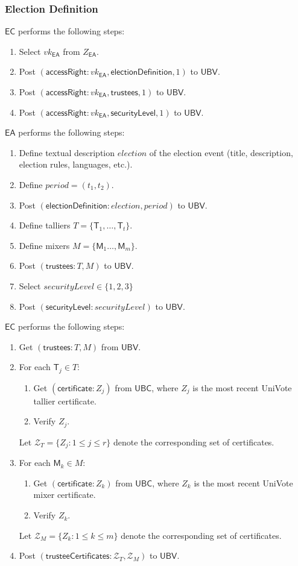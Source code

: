 \documentclass[bibtotoc,halfparskip,oneside]{scrreprt}
\newcommand{\descrElection}{\mathit{election}\xspace}
\newcommand{\period}{\mathit{period}\xspace}
\newcommand{\security}{\mathit{securityLevel}\xspace}
\newcommand{\vk}[1]{\mathit{vk}_{#1}\xspace}
\newcommand{\EA}{\ensuremath{\mathsf{EA}}\xspace}
\newcommand{\EC}{\ensuremath{\mathsf{EC}}\xspace}
\newcommand{\UBC}{\ensuremath{\mathsf{UBC}}\xspace}
\newcommand{\UBV}{\ensuremath{\mathsf{UBV}}\xspace}
\newcommand{\Tallier}[1]{\ensuremath{\mathsf{T}_{#1}}\xspace}
\newcommand{\Mixer}[1]{\ensuremath{\mathsf{M}_{#1}}\xspace}
\begin{document}
	\subsubsection{Election Definition}
	\EC performs the following steps: 
	\begin{enumerate}
		\item Select $\vk{\EA}$ from $Z_{\EA}$.
		\item Post $(\mathsf{accessRight}: \vk{\EA}, \mathsf{electionDefinition}, 1)$ to \UBV.
		\item Post $(\mathsf{accessRight}: \vk{\EA}, \mathsf{trustees}, 1)$ to \UBV.
		\item Post $(\mathsf{accessRight}: \vk{\EA}, \mathsf{securityLevel}, 1)$ to \UBV.
	\end{enumerate}
	\EA performs the following steps: 
	\begin{enumerate}[resume]
		\item Define textual description $\descrElection$ of the election event (title, description, election rules, languages, etc.).
		\item Define $\period =(t_{1},t_{2})$.
		\item Post $(\mathsf{electionDefinition}: \descrElection,\period)$ to \UBV.
		\item Define talliers $T=\{\Tallier{1},\ldots,\Tallier{t}\}$.
		\item Define mixers $M=\{\Mixer{1}\ldots,\Mixer{m}\}$.
		\item Post $(\mathsf{trustees}: T, M)$ to \UBV.
		\item Select $\security\in\{1,2,3\}$
		\item Post $(\mathsf{securityLevel}: \security)$ to \UBV.
	\end{enumerate}
	\EC performs the following steps:
	\begin{enumerate}[resume]
		\item Get $(\mathsf{trustees}: T, M)$ from \UBV.
		\item For each $\Tallier{j}\in T$:
		\begin{enumerate}
			\item Get $(\textsf{certificate}:Z_{j})$ from \UBC, where $Z_j$ is the most recent UniVote tallier certificate.
			\item Verify $Z_{j}$.
		\end{enumerate}
		Let $\mathcal{Z}_{T}=\{Z_j:1\leq j\leq r\}$  denote the corresponding set of certificates.
		\item For each $\Mixer{k}\in M$:
		\begin{enumerate}
			\item Get $(\textsf{certificate}:Z_{k})$ from \UBC, where $Z_k$ is the most recent UniVote mixer certificate.
			\item Verify $Z_{k}$.
		\end{enumerate}
		Let $\mathcal{Z}_{M}=\{Z_k:1\leq k\leq m\}$ denote the corresponding set of certificates.
		\item Post $(\mathsf{trusteeCertificates}: \mathcal{Z}_{T},\mathcal{Z}_{M})$ to \UBV.
	\end{enumerate}
	
\end{document}
